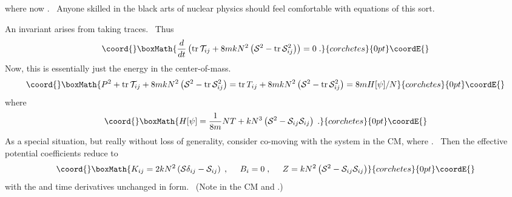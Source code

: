 \documentclass[a4paper,12pt]{article}%
\begin{document}
where now \coordHE{}. \ Anyone skilled in the black arts of nuclear physics
should feel comfortable with equations of this sort.

An invariant arises from taking traces. \ Thus%
\[\coord{}\boxMath{
\frac{d}{dt}\left(  \operatorname*{tr}\mathcal{T}_{ij}+8mkN^{2}\left(
\mathcal{S}^{2}-\operatorname*{tr}\mathcal{S}_{ij}^{2}\right)  \right)  =0\;.
}{corchetes}{0pt}\coordE{}\]
Now, this is essentially just the energy in the center-of-mass.%
\[\coord{}\boxMath{
P^{2}+\operatorname*{tr}\mathcal{T}_{ij}+8mkN^{2}\left(  \mathcal{S}%
^{2}-\operatorname*{tr}\mathcal{S}_{ij}^{2}\right)  =\operatorname*{tr}%
T_{ij}+8mkN^{2}\left(  \mathcal{S}^{2}-\operatorname*{tr}\mathcal{S}_{ij}%
^{2}\right)  =8mH[\psi]/N
}{corchetes}{0pt}\coordE{}\]
where%
\[\coord{}\boxMath{
H[\psi]=\frac{1}{8m}NT+kN^{3}\left(  \mathcal{S}^{2}-\mathcal{S}%
_{ij}\mathcal{S}_{ij}\right)  \;.
}{corchetes}{0pt}\coordE{}\]
As a special situation, but really without loss of generality, consider
co-moving with the system in the CM, where \coordHE{}. \ Then the
effective potential coefficients reduce to
\[\coord{}\boxMath{
K_{ij}=2kN^{2}\left(  \mathcal{S}\delta_{ij}-\mathcal{S}_{ij}\right)
\;,\;\;\;\;\;B_{i}=0\;,\;\;\;\;\;Z=kN^{2}\left(  \mathcal{S}^{2}%
-\mathcal{S}_{ij}\mathcal{S}_{ij}\right)
}{corchetes}{0pt}\coordE{}\]
with the \coordHE{} and \coordHE{} time
derivatives unchanged in form. \ (Note in the CM \coordHE{} and \coordHE{}.) \ 
\end{document}
